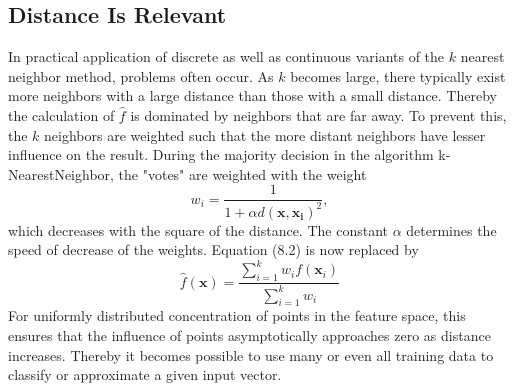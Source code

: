 \documentclass[10pt]{book}
\begin{document}
\subsection{Distance Is Relevant}
In practical application of discrete as well as continuous variants of the $k$ nearest neighbor method, problems often occur. As $k$ becomes large, there typically exist more neighbors with a large distance than those with a small distance. Thereby the calculation of $\hat{f}$ is dominated by neighbors that are far away. To prevent this, the $k$ neighbors are weighted such that the more distant neighbors have lesser influence on the result. During the majority decision in the algorithm k-NearestNeighbor, the "votes" are weighted with the weight
\begin{equation*}
w_{i}=\frac{1}{1+\alpha d\left(\boldsymbol{x}, \boldsymbol{x}_{\boldsymbol{i}}\right)^{2}}, \tag{8.3}
\end{equation*}
which decreases with the square of the distance. The constant $\alpha$ determines the speed of decrease of the weights. Equation (8.2) is now replaced by
\[
\hat{f}(\boldsymbol{x})=\frac{\sum_{i=1}^{k} w_{i} f\left(\boldsymbol{x}_{i}\right)}{\sum_{i=1}^{k} w_{i}}
\]
For uniformly distributed concentration of points in the feature space, this ensures that the influence of points asymptotically approaches zero as distance increases. Thereby it becomes possible to use many or even all training data to classify or approximate a given input vector.
\end{document}
